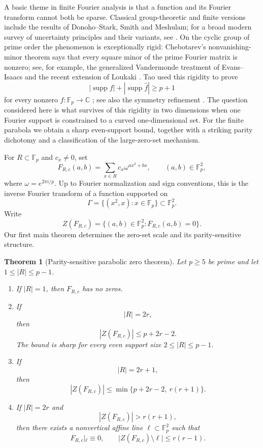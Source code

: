 \documentclass[11pt]{article}
\newtheorem{theorem}{Theorem}[section]
\newcommand{\F}{\mathbb F}
\newcommand{\C}{\mathbb C}
\newcommand{\supp}{\operatorname{supp}}
\begin{document}
A basic theme in finite Fourier analysis is that a function and its Fourier
transform cannot both be sparse.  Classical group-theoretic and finite
versions include the results of Donoho--Stark, Smith and Meshulam; for a broad
modern survey of uncertainty principles and their variants, see
\cite{DonohoStark,SmithGroups,Meshulam,WigdersonSurvey}.  On the cyclic group
of prime order the phenomenon is exceptionally rigid: Chebotarev's
nonvanishing-minor theorem says that every square minor of the prime Fourier
matrix is nonzero; see, for example, the generalized Vandermonde treatment of
Evans--Isaacs and the recent extension of Loukaki
\cite{EvansIsaacs,LoukakiChebotarev}.  Tao used this rigidity to prove
\begin{equation}
 |\supp f|+|\supp\widehat f|\ge p+1
 \label{eq:intro-tao}
\end{equation}
for every nonzero $f:\F_p\to\C$ \cite{Tao}; see also the symmetry refinement
\cite{GarciaKaraaliKatz}.  The question considered here is what survives of
this rigidity in two dimensions when one Fourier support is constrained to a
curved one-dimensional set.  For the finite parabola we obtain a sharp
even-support bound, together with a striking parity dichotomy and a
classification of the large-zero-set mechanism.

For $R\subset\F_p$ and $c_x\ne0$, set
\begin{equation}
 F_{R,c}(a,b)
 =\sum_{x\in R}c_x\omega^{ax^2+bx},
 \qquad (a,b)\in\F_p^2,
 \label{eq:intro-parabolic-sum}
\end{equation}
where $\omega=e^{2\pi i/p}$.  Up to Fourier normalization and sign
conventions, this is the inverse Fourier transform of a function supported on
\[
 \Gamma=\{(x^2,x):x\in\F_p\}\subset\F_p^2.
\]
Write
\[
 Z(F_{R,c})=\{(a,b)\in\F_p^2:F_{R,c}(a,b)=0\}.
\]
Our first main theorem determines the zero-set scale and its parity-sensitive
structure.

\begin{theorem}[Parity-sensitive parabolic zero theorem]
\label{thm:intro-parabolic}
Let \(p\ge5\) be prime and let \(1\le |R|\le p-1\).

\begin{enumerate}
\item If \(|R|=1\), then \(F_{R,c}\) has no zeros.

\item If
\[
 |R|=2r,
\]
then
\[
 \boxed{|Z(F_{R,c})|\le p+2r-2.}
\]
The bound is sharp for every even support size \(2\le |R|\le p-1\).

\item If
\[
 |R|=2r+1,
\]
then
\[
 \boxed{
 |Z(F_{R,c})|
 \le
 \min\{p+2r-2,\ r(r+1)\}.
 }
\]

\item If \(|R|=2r\) and
\[
 |Z(F_{R,c})|>r(r+1),
\]
then there exists a nonvertical affine line \(\ell\subset\F_p^2\)
such that
\[
 F_{R,c}|_\ell\equiv0,
 \qquad
 |Z(F_{R,c})\setminus\ell|\le r(r-1).
\]
\end{enumerate}
\end{theorem}
\end{document}
